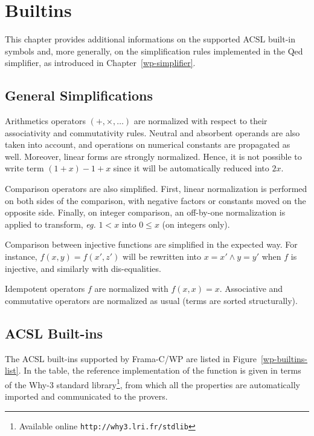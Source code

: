 \chapter{Builtins}
\label{wp-builtins}

This chapter provides additional informations on the supported \textsf{ACSL} built-in symbols and, more generally,
on the simplification rules implemented in the \textsf{Qed} simplifier, as introduced in Chapter~\ref{wp-simplifier}.

\section{General Simplifications}

Arithmetics operators $(+,\times,\dots)$ are normalized with respect to their associativity and commutativity rules.
Neutral and absorbent operands are also taken into account, and operations on numerical constants are propagated as well.
Moreover, linear forms are strongly normalized.
Hence, it is not possible to write term $(1+x)-1+x$ since it will be automatically reduced into $2x$.

Comparison operators are also simplified. First, linear normalization is performed on both sides of the comparison,
with negative factors or constants moved on the opposite side. Finally, on integer comparison,
an off-by-one normalization is applied to transform, \emph{eg.} $1<x$ into $0\leq x$ (on integers only).

Comparison between injective functions are simplified in the expected way.
For instance, $f(x,y)=f(x',z')$ will be rewritten into $x=x' \wedge y=y'$ when $f$ is injective, and similarly with dis-equalities.

Idempotent operators $f$ are normalized with $f(x,x)=x$. Associative and commutative operators are normalized as usual
(terms are sorted structurally).

\section{ACSL Built-ins}

\newcommand{\page}[1]{\footnotesize{p.\pageref{#1}}}
\newcommand{\builtin}[1]{\mathtt{\backslash#1}}
\newcommand{\wref}[2]{\href{http://why3.lri.fr/stdlib/#1}{\texttt{#1.#2}}}

The \textsf{ACSL} built-ins supported by \textsf{Frama-C/WP} are listed in Figure~\ref{wp-builtins-list}.
In the table, the reference implementation of the function is given in terms of the \textsf{Why-3}
standard library\footnote{Available online \texttt{http://why3.lri.fr/stdlib}},
from which all the properties are automatically imported and communicated to the provers.

